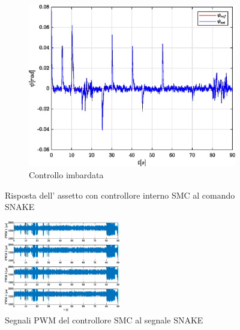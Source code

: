 \begin{figure}
	\hfill
	\begin{subfigure}{0.45\textwidth}
		\centering
		\includegraphics[width=1\textwidth]{Simulazioni/Figure/SMC/SNAKE/AttitudeControlYaw}
		\caption{Controllo imbardata}
		\label{fig:SNAKEyawSMC}
	\end{subfigure}
	\caption{Risposta dell' assetto con controllore interno SMC al comando SNAKE}
\end{figure}


\begin{figure}
	\centering
	\includegraphics[width=0.45\textwidth]{Simulazioni/Figure/SMC/SNAKE/PWM}
	\caption{Segnali PWM del controllore SMC al segnale SNAKE}
	\label{fig:SNAKEPWMSMC}
\end{figure}

